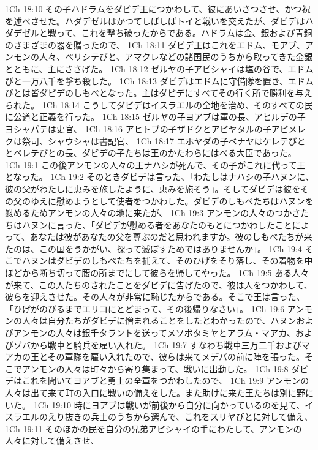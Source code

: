 1Ch 18:10  その子ハドラムをダビデ王につかわして、彼にあいさつさせ、かつ祝を述べさせた。ハダデゼルはかつてしばしばトイと戦いを交えたが、ダビデはハダデゼルと戦って、これを撃ち破ったからである。ハドラムは金、銀および青銅のさまざまの器を贈ったので、
1Ch 18:11  ダビデ王はこれをエドム、モアブ、アンモンの人々、ペリシテびと、アマクレなどの諸国民のうちから取ってきた金銀とともに、主にささげた。
1Ch 18:12  ゼルヤの子アビシャイは塩の谷で、エドムびと一万八千を撃ち殺した。
1Ch 18:13  ダビデはエドムに守備隊を置き、エドムびとは皆ダビデのしもべとなった。主はダビデにすべてその行く所で勝利を与えられた。
1Ch 18:14  こうしてダビデはイスラエルの全地を治め、そのすべての民に公道と正義を行った。
1Ch 18:15  ゼルヤの子ヨアブは軍の長、アヒルデの子ヨシャパテは史官、
1Ch 18:16  アヒトブの子ザドクとアビヤタルの子アビメレクは祭司、シャウシャは書記官、
1Ch 18:17  エホヤダの子ベナヤはケレテびととペレテびとの長、ダビデの子たちは王のかたわらにはべる大臣であった。
1Ch 19:1  この後アンモンの人々の王ナハシが死んで、その子がこれに代って王となった。
1Ch 19:2  そのときダビデは言った、「わたしはナハシの子ハヌンに、彼の父がわたしに恵みを施したように、恵みを施そう」。そしてダビデは彼をその父のゆえに慰めようとして使者をつかわした。ダビデのしもべたちはハヌンを慰めるためアンモンの人々の地に来たが、
1Ch 19:3  アンモンの人々のつかさたちはハヌンに言った、「ダビデが慰める者をあなたのもとにつかわしたことによって、あなたは彼があなたの父を尊ぶのだと思われますか。彼のしもべたちが来たのは、この国をうかがい、探って滅ぼすためではありませんか」。
1Ch 19:4  そこでハヌンはダビデのしもべたちを捕えて、そのひげをそり落し、その着物を中ほどから断ち切って腰の所までにして彼らを帰してやった。
1Ch 19:5  ある人々が来て、この人たちのされたことをダビデに告げたので、彼は人をつかわして、彼らを迎えさせた。その人々が非常に恥じたからである。そこで王は言った、「ひげがのびるまでエリコにとどまって、その後帰りなさい」。
1Ch 19:6  アンモンの人々は自分たちがダビデに憎まれることをしたとわかったので、ハヌンおよびアンモンの人々は銀千タラントを送ってメソポタミヤとアラム・マアカ、およびゾバから戦車と騎兵を雇い入れた。
1Ch 19:7  すなわち戦車三万二千およびマアカの王とその軍隊を雇い入れたので、彼らは来てメデバの前に陣を張った。そこでアンモンの人々は町々から寄り集まって、戦いに出動した。
1Ch 19:8  ダビデはこれを聞いてヨアブと勇士の全軍をつかわしたので、
1Ch 19:9  アンモンの人々は出て来て町の入口に戦いの備えをした。また助けに来た王たちは別に野にいた。
1Ch 19:10  時にヨアブは戦いが前後から自分に向かっているのを見て、イスラエルのえり抜きの兵士のうちから選んで、これをスリヤびとに対して備え、
1Ch 19:11  そのほかの民を自分の兄弟アビシャイの手にわたして、アンモンの人々に対して備えさせ、
